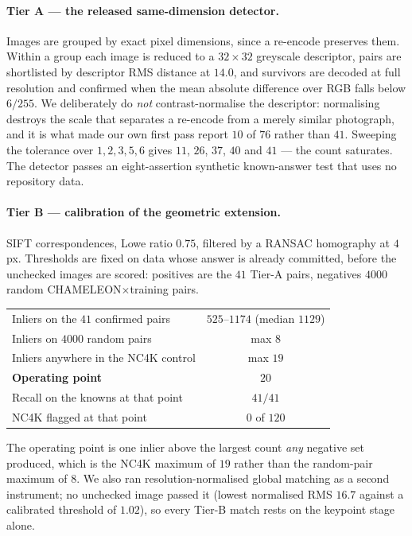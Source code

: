\documentclass{article}
\begin{document}
\paragraph{Tier A --- the released same-dimension detector.} Images are grouped by exact pixel
dimensions, since a re-encode preserves them. Within a group each image is reduced to a
$32\times32$ greyscale descriptor, pairs are shortlisted by descriptor RMS distance at $14.0$, and
survivors are decoded at full resolution and confirmed when the mean absolute difference over RGB
falls below $6/255$. We deliberately do \emph{not} contrast-normalise the descriptor: normalising
destroys the scale that separates a re-encode from a merely similar photograph, and it is what made
our own first pass report $10$ of $76$ rather than $41$. Sweeping the tolerance over
$1, 2, 3, 5, 6$ gives $11$, $26$, $37$, $40$ and $41$ --- the count saturates. The detector passes an
eight-assertion synthetic known-answer test that uses no repository data.

\paragraph{Tier B --- calibration of the geometric extension.} SIFT correspondences, Lowe ratio
$0.75$, filtered by a RANSAC homography at $4$ px. Thresholds are fixed on data whose answer is
already committed, before the unchecked images are scored: positives are the $41$ Tier-A pairs,
negatives $4000$ random CHAMELEON$\times$training pairs.

\begin{center}\small
\begin{tabular}{lc}
\toprule
Inliers on the $41$ confirmed pairs & $525$--$1174$ (median $1129$) \\
Inliers on $4000$ random pairs & max $8$ \\
Inliers anywhere in the NC4K control & max $19$ \\
\textbf{Operating point} & \textbf{$20$} \\
Recall on the knowns at that point & $41/41$ \\
NC4K flagged at that point & $0$ of $120$ \\
\bottomrule
\end{tabular}
\end{center}

The operating point is one inlier above the largest count \emph{any} negative set produced, which is
the NC4K maximum of $19$ rather than the random-pair maximum of $8$. We also ran resolution-normalised
global matching as a second instrument; no unchecked image passed it (lowest normalised RMS $16.7$
against a calibrated threshold of $1.02$), so every Tier-B match rests on the keypoint stage alone.
\end{document}
